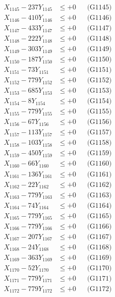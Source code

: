 \documentclass[a4paper,10pt]{article}
\begin{document}
{\begin{align}
X_{1145} - 237Y_{1145} &\leq +0 && \text{(G1145)} \\
X_{1146} - 410Y_{1146} &\leq +0 && \text{(G1146)} \\
X_{1147} - 433Y_{1147} &\leq +0 && \text{(G1147)} \\
X_{1148} - 222Y_{1148} &\leq +0 && \text{(G1148)} \\
X_{1149} - 303Y_{1149} &\leq +0 && \text{(G1149)} \\
X_{1150} - 187Y_{1150} &\leq +0 && \text{(G1150)} \\
\allowbreak
X_{1151} - 73Y_{1151} &\leq +0 && \text{(G1151)} \\
X_{1152} - 779Y_{1152} &\leq +0 && \text{(G1152)} \\
X_{1153} - 685Y_{1153} &\leq +0 && \text{(G1153)} \\
X_{1154} - 8Y_{1154} &\leq +0 && \text{(G1154)} \\
X_{1155} - 779Y_{1155} &\leq +0 && \text{(G1155)} \\
X_{1156} - 67Y_{1156} &\leq +0 && \text{(G1156)} \\
X_{1157} - 113Y_{1157} &\leq +0 && \text{(G1157)} \\
X_{1158} - 103Y_{1158} &\leq +0 && \text{(G1158)} \\
X_{1159} - 450Y_{1159} &\leq +0 && \text{(G1159)} \\
X_{1160} - 66Y_{1160} &\leq +0 && \text{(G1160)} \\
\allowbreak
X_{1161} - 136Y_{1161} &\leq +0 && \text{(G1161)} \\
X_{1162} - 22Y_{1162} &\leq +0 && \text{(G1162)} \\
X_{1163} - 779Y_{1163} &\leq +0 && \text{(G1163)} \\
X_{1164} - 74Y_{1164} &\leq +0 && \text{(G1164)} \\
X_{1165} - 779Y_{1165} &\leq +0 && \text{(G1165)} \\
X_{1166} - 779Y_{1166} &\leq +0 && \text{(G1166)} \\
X_{1167} - 207Y_{1167} &\leq +0 && \text{(G1167)} \\
X_{1168} - 24Y_{1168} &\leq +0 && \text{(G1168)} \\
X_{1169} - 363Y_{1169} &\leq +0 && \text{(G1169)} \\
X_{1170} - 52Y_{1170} &\leq +0 && \text{(G1170)} \\
\allowbreak
X_{1171} - 779Y_{1171} &\leq +0 && \text{(G1171)} \\
X_{1172} - 779Y_{1172} &\leq +0 && \text{(G1172)} \\

\end{align}}
\end{document}
